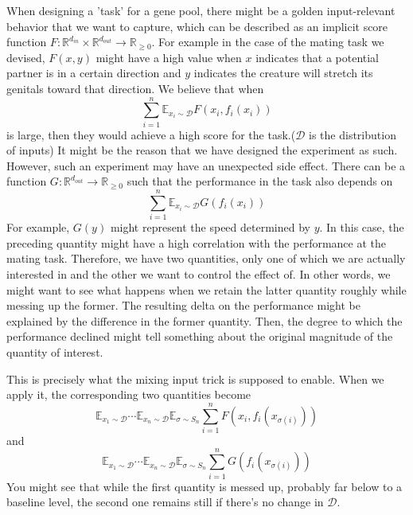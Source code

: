\documentclass{article}
\numberwithin{equation}{section}
\begin{document}
When designing a 'task' for a gene pool, there might be a golden input-relevant behavior that we want to capture,  which can be described as an implicit score function $F:\mathbb{R}^{d_{in}}\times\mathbb{R}^{d_{out}}\to\mathbb{R}_{\ge 0}$. For example in the case of the mating task we devised, $F(x,y)$ might have a high value when $x$ indicates that a potential partner is in a certain direction and $y$  indicates the creature will stretch its genitals toward that direction. We believe that when 
\begin{equation*}
\sum_{i=1}^{n}\mathbb{E}_{x_i\sim \mathcal{D}}F(x_i,f_i(x_i))
\end{equation*}
 is large, then they would achieve a high score for the task.($\mathcal{D}$ is the distribution of inputs) It might be the reason that we have designed the experiment as such. However, such an experiment may have an unexpected side effect. There can be a function $G:\mathbb{R}^{d_{out}}\to\mathbb{R}_{\ge 0}$ such that the performance in the task also depends on 
\begin{equation*}
\sum_{i=1}^{n}\mathbb{E}_{x_i\sim\mathcal{D}}G(f_i(x_i))
\end{equation*}  
For example, $G(y)$ might represent the speed determined by $y$. In this case, the preceding quantity might have a high correlation with the performance at the mating task. Therefore, we have two quantities, only one of which we are actually interested in and the other we want to control the effect of. In other words, we might want to see what happens when we retain the latter quantity roughly while messing up the former. The resulting delta on the performance might be explained by the difference in the former quantity. Then, the degree to which the performance declined might tell something about the original magnitude of the quantity of interest.


This is precisely what the mixing input trick is supposed to enable. When we apply it, the corresponding two quantities become
\begin{equation*}
\mathbb{E}_{x_1\sim\mathcal{D}}\cdots\mathbb{E}_{x_n\sim\mathcal{D}}\mathbb{E}_{\sigma\sim S_n} \sum_{i=1}^{n}F(x_i,f_i(x_{\sigma(i)}))
\end{equation*} 
and 
\begin{equation*}
\mathbb{E}_{x_1\sim\mathcal{D}}\cdots\mathbb{E}_{x_n\sim\mathcal{D}}\mathbb{E}_{\sigma\sim S_n} \sum_{i=1}^{n}G(f_i(x_{\sigma(i)}))
\end{equation*} 
You might see that while the first quantity is messed up, probably far below to a baseline level, the second one remains still if there's no change in $\mathcal{D}$. 
\end{document}
